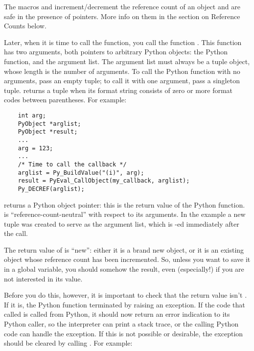 \documentclass{manual}
\begin{document}
The macros  and 
increment/decrement the reference count of an object and are safe in
the presence of \NULL{} pointers.  More info on them in the section on
Reference Counts below.

Later, when it is time to call the function, you call the \C{} function
.  This function has two arguments, both
pointers to arbitrary Python objects: the Python function, and the
argument list.  The argument list must always be a tuple object, whose
length is the number of arguments.  To call the Python function with
no arguments, pass an empty tuple; to call it with one argument, pass
a singleton tuple.   returns a tuple when its
format string consists of zero or more format codes between
parentheses.  For example:

\begin{verbatim}
    int arg;
    PyObject *arglist;
    PyObject *result;
    ...
    arg = 123;
    ...
    /* Time to call the callback */
    arglist = Py_BuildValue("(i)", arg);
    result = PyEval_CallObject(my_callback, arglist);
    Py_DECREF(arglist);
\end{verbatim}

 returns a Python object pointer: this is
the return value of the Python function.   is
``reference-count-neutral'' with respect to its arguments.  In the
example a new tuple was created to serve as the argument list, which
is -ed immediately after the call.

The return value of  is ``new'': either it
is a brand new object, or it is an existing object whose reference
count has been incremented.  So, unless you want to save it in a
global variable, you should somehow  the result,
even (especially!) if you are not interested in its value.

Before you do this, however, it is important to check that the return
value isn't \NULL{}.  If it is, the Python function terminated by
raising an exception.  If the \C{} code that called
 is called from Python, it should now
return an error indication to its Python caller, so the interpreter
can print a stack trace, or the calling Python code can handle the
exception.  If this is not possible or desirable, the exception should
be cleared by calling .  For example:
\end{document}
